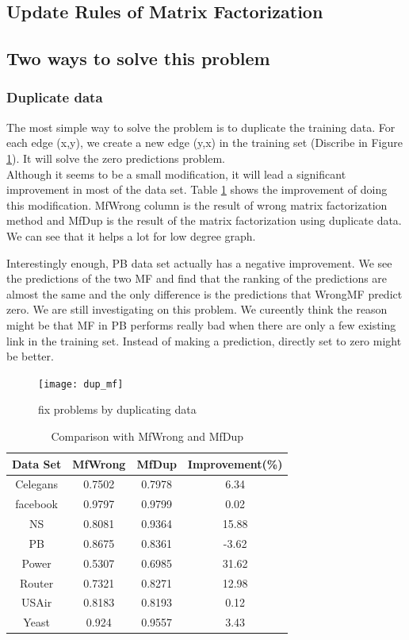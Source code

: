 \documentclass[12pt]{article}
\begin{document}
\subsection {Update Rules of Matrix Factorization}


\subsection{Two ways to solve this problem}

\subsubsection{Duplicate data}
The most simple way to solve the problem is to duplicate the training data. For each edge (x,y), we create a new edge (y,x) in the training set (Discribe in Figure \ref{fig:dup_mf}). It will solve the zero predictions problem. 
\\
Although it seems to be a small modification, it will lead a significant improvement in most of the data set.
Table \ref{tab:dup} shows the improvement of doing this modification. MfWrong column is the result of wrong matrix factorization method and MfDup is the result of the matrix factorization using duplicate data. We can see that it helps a lot for low degree graph. 

Interestingly enough, PB data set actually has a negative improvement. We see the predictions of the two MF and find that the ranking of the predictions are almost the same and the only difference is the predictions that WrongMF predict zero. We are still investigating on this problem. We cureently think the reason might be that MF in PB performs really bad when there are only a few existing link in the training set. Instead of making a prediction, directly set to zero might be better. 

\begin{figure}[h]
	\centering
	\texttt{[image: dup\_mf]}
	\caption{fix problems by duplicating data}
	\label{fig:dup_mf}
\end{figure}

\begin{table}
	\begin{center}
		\begin{tabular}{|c|c|c|c|}
			\hline
			Data Set & MfWrong & MfDup & Improvement(\%) \\
			\hline
			Celegans&0.7502&0.7978&6.34\\
			facebook&0.9797&0.9799&0.02\\
			NS&0.8081&0.9364&15.88\\
			PB&0.8675&0.8361&-3.62\\
			Power&0.5307&0.6985&31.62\\
			Router&0.7321&0.8271&12.98\\
			USAir&0.8183&0.8193&0.12\\
			Yeast&0.924&0.9557&3.43\\
			\hline
		\end{tabular}
	\end{center}
	\caption{Comparison with MfWrong and MfDup}
	\label{tab:dup}
\end{table}
\end{document}
